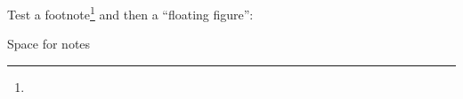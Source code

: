 \documentclass[12pt]{article}
\newcounter{xxx}
\begin{document}
Test a footnote\footnote{%
} and then a ``floating figure'': 
\begin{floatingfigure}{.4\linewidth}
\vspace*{3\baselineskip}
\textsf{Space for notes}
\end{floatingfigure}
\setcounter{xxx}{0}%
% 
\end{document}
